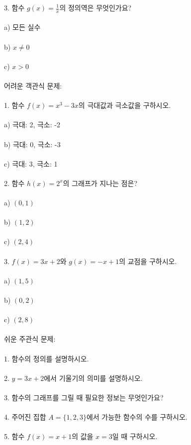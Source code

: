 \documentclass[fleqn]{article}
\begin{document}
3. 함수 $g(x) = \frac{1}{x}$의 정의역은 무엇인가요? \\\\  
   a) 모든 실수 \\\\  
   b) $x \neq 0$ \\\\  
   c) $x > 0$ \\\\  

어려운 객관식 문제: \\\\  
1. 함수 $f(x) = x^3 - 3x$의 극대값과 극소값을 구하시오. \\\\  
   a) 극대: 2, 극소: -2 \\\\  
   b) 극대: 0, 극소: -3 \\\\  
   c) 극대: 3, 극소: 1 \\\\  

2. 함수 $h(x) = 2^x$의 그래프가 지나는 점은? \\\\  
   a) $(0, 1)$ \\\\  
   b) $(1, 2)$ \\\\  
   c) $(2, 4)$ \\\\  

3. $f(x) = 3x + 2$와 $g(x) = -x + 1$의 교점을 구하시오. \\\\  
   a) $(1, 5)$ \\\\  
   b) $(0, 2)$ \\\\  
   c) $(2, 8)$ \\\\  

쉬운 주관식 문제: \\\\  
1. 함수의 정의를 설명하시오. \\\\  
2. $y = 3x + 2$에서 기울기의 의미를 설명하시오. \\\\  
3. 함수의 그래프를 그릴 때 필요한 정보는 무엇인가요? \\\\  
4. 주어진 집합 $A = \{1, 2, 3\}$에서 가능한 함수의 수를 구하시오. \\\\  
5. 함수 $f(x) = x + 1$의 값을 $x = 3$일 때 구하시오. \\\\  
\end{document}

